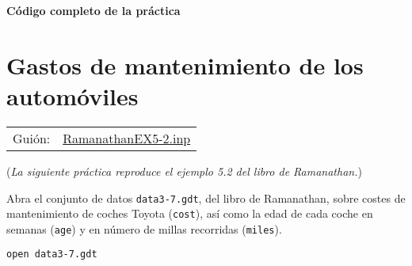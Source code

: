 \documentclass[11pt]{article}
\begin{document}
\clearpage
\vspace{10pt}
\noindent
\textbf{Código completo de la práctica}
\vspace{10pt}

\clearpage


\section{Gastos de mantenimiento de los automóviles}
\label{sec:org97c5874}
\begin{center}
\begin{tabular}{ll}
Guión: & \href{https://github.com/mbujosab/Ectr/tree/master/Practicas/Gretl/scripts/RamanathanEX5-2.inp}{RamanathanEX5-2.inp}\\
\end{tabular}
\end{center}

(\emph{La siguiente práctica reproduce el ejemplo 5.2 del libro de Ramanathan.})

Abra el conjunto de datos \texttt{data3-7.gdt}, del libro de Ramanathan,
sobre costes de mantenimiento de coches Toyota (\texttt{cost}), así como la
edad de cada coche en semanas (\texttt{age}) y en número de millas recorridas
(\texttt{miles}).
{\vspace{0pt} \color{gray!70!black}
\begin{verbatim}
open data3-7.gdt
\end{verbatim}
}
\end{document}
